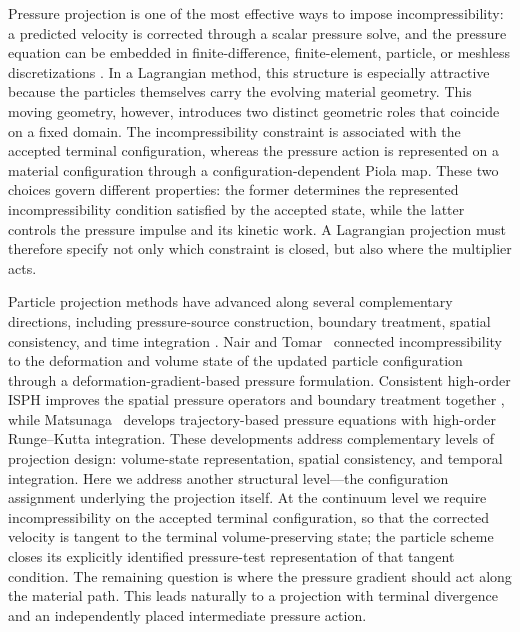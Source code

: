 \documentclass[11pt]{article}
\theoremstyle{plain}
\theoremstyle{definition}
\theoremstyle{remark}
\begin{document}
Pressure projection is one of the most effective ways to impose incompressibility: a predicted velocity is corrected through a scalar pressure solve, and the pressure equation can be embedded in finite-difference, finite-element, particle, or meshless discretizations \cite{Chorin1968,Temam1969,GuermondMinevShen2006}. In a Lagrangian method, this structure is especially attractive because the particles themselves carry the evolving material geometry. This moving geometry, however, introduces two distinct geometric roles that coincide on a fixed domain. The incompressibility constraint is associated with the accepted terminal configuration, whereas the pressure action is represented on a material configuration through a configuration-dependent Piola map. These two choices govern different properties: the former determines the represented incompressibility condition satisfied by the accepted state, while the latter controls the pressure impulse and its kinetic work. A Lagrangian projection must therefore specify not only which constraint is closed, but also where the multiplier acts.

Particle projection methods have advanced along several complementary directions, including pressure-source construction, boundary treatment, spatial consistency, and time integration \cite{CumminsRudman1999,XuStansbyLaurence2009,KhayyerGotoh2011,GotohKhayyerGotoh2024}. Nair and Tomar~\cite{NairTomar2015} connected incompressibility to the deformation and volume state of the updated particle configuration through a deformation-gradient-based pressure formulation. Consistent high-order ISPH improves the spatial pressure operators and boundary treatment together \cite{ZhangEtAl2024}, while Matsunaga~\cite{Matsunaga2025} develops trajectory-based pressure equations with high-order Runge--Kutta integration.  These developments address complementary levels of projection design: volume-state representation, spatial consistency, and temporal integration. Here we address another structural level---the configuration assignment underlying the projection itself. At the continuum level we require incompressibility on the accepted terminal configuration, so that the corrected velocity is tangent to the terminal volume-preserving state; the particle scheme closes its explicitly identified pressure-test representation of that tangent condition. The remaining question is where the pressure gradient should act along the material path. This leads naturally to a projection with terminal divergence and an independently placed intermediate pressure action.
\end{document}
